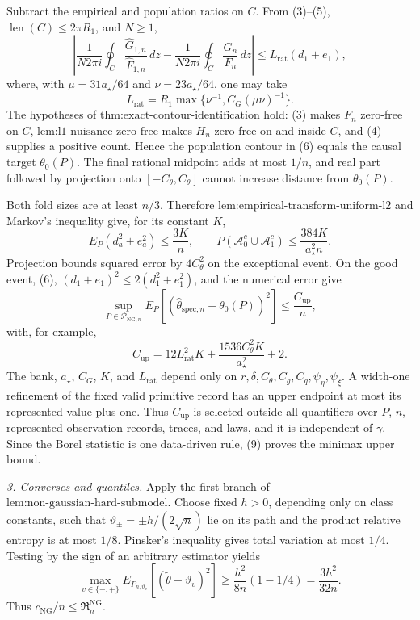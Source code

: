 Subtract the empirical and population ratios on \(C\).  From (3)--(5), \(\operatorname{len}(C)\le2\pi R_1\), and \(N\ge1\),
\[
 \left|
 \frac1{N2\pi i}\oint_C\frac{\widehat G_{1,n}}{\widehat F_{1,n}}\,dz
 -\frac1{N2\pi i}\oint_C\frac{G_n}{F_n}\,dz
 \right|
 \le L_{\mathrm{rat}}(d_1+e_1), \tag{6}
\]
where, with \(\mu=31a_{\star}/64\) and \(\nu=23a_{\star}/64\), one may take
\[
 L_{\mathrm{rat}}=R_1\max\{\nu^{-1},C_G(\mu\nu)^{-1}\}. \tag{7}
\]
The hypotheses of \(\text{thm:exact-contour-identification}\) hold: (3) makes \(F_n\) zero-free on \(C\), \(\text{lem:l1-nuisance-zero-free}\) makes \(H_n\) zero-free on and inside \(C\), and (4) supplies a positive count.  Hence the population contour in (6) equals the causal target \(\theta_0(P)\).  The final rational midpoint adds at most \(1/n\), and real part followed by projection onto \([-C_{\theta},C_{\theta}]\) cannot increase distance from \(\theta_0(P)\).

Both fold sizes are at least \(n/3\).  Therefore \(\text{lem:empirical-transform-uniform-l2}\) and Markov's inequality give, for its constant \(K\),
\[
 E_P(d_a^2+e_a^2)\le\frac{3K}{n},
 \qquad
 P(\mathcal A_0^c\cup\mathcal A_1^c)
 \le\frac{384K}{a_{\star}^2n}. \tag{8}
\]
Projection bounds squared error by \(4C_{\theta}^2\) on the exceptional event.  On the good event, (6), \((d_1+e_1)^2\le2(d_1^2+e_1^2)\), and the numerical error give
\[
 \sup_{P\in\mathcal P_{\mathrm{NG},n}}
 E_P[(\widehat\theta_{\mathrm{spec},n}-\theta_0(P))^2]
 \le\frac{C_{\mathrm{up}}}{n}, \tag{9}
\]
with, for example,
\[
 C_{\mathrm{up}}
 =12L_{\mathrm{rat}}^2K
 +\frac{1536C_{\theta}^2K}{a_{\star}^2}+2. \tag{10}
\]
The bank, \(a_{\star}\), \(C_G\), \(K\), and \(L_{\mathrm{rat}}\) depend only on \(r,\delta,C_{\theta},C_g,C_q,\psi_{\eta},\psi_{\xi}\).  A width-one refinement of the fixed valid primitive record has an upper endpoint at most its represented value plus one.  Thus \(C_{\mathrm{up}}\) is selected outside all quantifiers over \(P\), \(n\), represented observation records, traces, and laws, and it is independent of \(\gamma\).  Since the Borel statistic is one data-driven rule, (9) proves the minimax upper bound.

\emph{3. Converses and quantiles.}  Apply the first branch of \(\text{lem:non-gaussian-hard-submodel}\).  Choose fixed \(h>0\), depending only on class constants, such that \(\vartheta_{\pm}=\pm h/(2\sqrt n)\) lie on its path and the product relative entropy is at most \(1/8\).  Pinsker's inequality gives total variation at most \(1/4\).  Testing by the sign of an arbitrary estimator yields
\[
 \max_{v\in\{-,+\}}
 E_{P_{n,\vartheta_v}}[(\widetilde\theta-\vartheta_v)^2]
 \ge\frac{h^2}{8n}(1-1/4)
 =\frac{3h^2}{32n}. \tag{11}
\]
Thus \(c_{\mathrm{NG}}/n\le\mathfrak R_n^{\mathrm{NG}}\).

